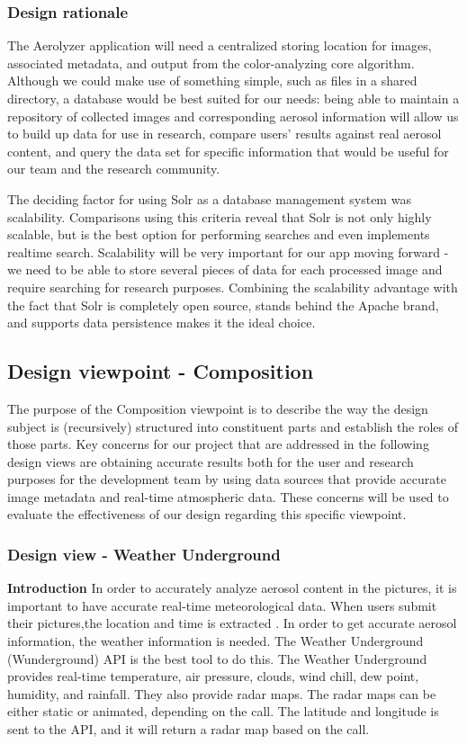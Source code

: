 \documentclass[onecolumn, draftclsnofoot,10pt, compsoc]{IEEEtran}
\begin{document}
\begin{flushleft}
\subsubsection{Design rationale}
The Aerolyzer application will need a centralized storing location for images, associated metadata, and output from the color-analyzing core algorithm. Although we could make use of something simple, such as files in a shared directory, a database would be best suited for our needs: being able to maintain a repository of collected images and corresponding aerosol information will allow us to build up data for use in research, compare users’ results against real aerosol content, and query the data set for specific information that would be useful for our team and the research community. 

\medskip

The deciding factor for using Solr as a database management system was scalability. Comparisons using this criteria reveal that Solr is not only highly scalable, but is the best option for performing searches and even implements realtime search. \cite{5} Scalability will be very important for our app moving forward - we need to be able to store several pieces of data for each processed image and require searching for research purposes. Combining the scalability advantage with the fact that Solr is completely open source, stands behind the Apache brand, and supports data persistence makes it the ideal choice.

\subsection{Design viewpoint - Composition}
The purpose of the Composition viewpoint is to describe the way the design subject is (recursively) structured into constituent parts and establish the roles of those parts.  Key concerns for our project that are addressed in the following design views are obtaining accurate results both for the user and research purposes for the development team by using data sources that provide accurate image metadata and real-time atmospheric data. These concerns will be used to evaluate the effectiveness of our design regarding this specific viewpoint.

\subsubsection{Design view - Weather Underground}
\textbf{Introduction} In order to accurately analyze aerosol content in the pictures, it is important to have accurate real-time meteorological data. When users submit their pictures,the location and time is extracted . In order to get accurate aerosol information, the weather information is needed. The Weather Underground (Wunderground) API is the best tool to do this. The Weather Underground provides real-time temperature, air pressure, clouds, wind chill, dew point, humidity, and rainfall. They also provide radar maps. The radar maps can be either static or animated, depending on the call. The latitude and longitude is sent to the API, and it will return a radar map based on the call. \cite{3}


\end{flushleft}
\end{document}
